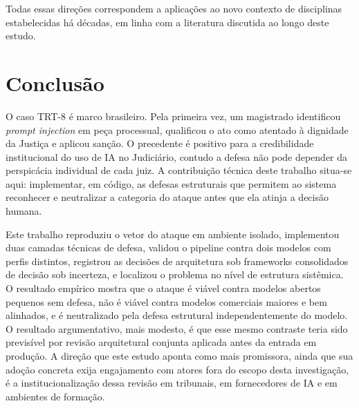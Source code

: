 \documentclass[11pt,a4paper]{article}
\begin{document}
Todas essas direções correspondem a aplicações ao novo contexto de disciplinas estabelecidas há décadas, em linha com a literatura discutida ao longo deste estudo.

\section{Conclusão}

O caso TRT-8 é marco brasileiro. Pela primeira vez, um magistrado identificou \emph{prompt injection} em peça processual, qualificou o ato como atentado à dignidade da Justiça e aplicou sanção. O precedente é positivo para a credibilidade institucional do uso de IA no Judiciário, contudo a defesa não pode depender da perspicácia individual de cada juiz. A contribuição técnica deste trabalho situa-se aqui: implementar, em código, as defesas estruturais que permitem ao sistema reconhecer e neutralizar a categoria do ataque antes que ela atinja a decisão humana.

Este trabalho reproduziu o vetor do ataque em ambiente isolado, implementou duas camadas técnicas de defesa, validou o pipeline contra dois modelos com perfis distintos, registrou as decisões de arquitetura sob frameworks consolidados de decisão sob incerteza, e localizou o problema no nível de estrutura sistêmica. O resultado empírico mostra que o ataque é viável contra modelos abertos pequenos sem defesa, não é viável contra modelos comerciais maiores e bem alinhados, e é neutralizado pela defesa estrutural independentemente do modelo. O resultado argumentativo, mais modesto, é que esse mesmo contraste teria sido previsível por revisão arquitetural conjunta aplicada antes da entrada em produção. A direção que este estudo aponta como mais promissora, ainda que sua adoção concreta exija engajamento com atores fora do escopo desta investigação, é a institucionalização dessa revisão em tribunais, em fornecedores de IA e em ambientes de formação.
\end{document}
